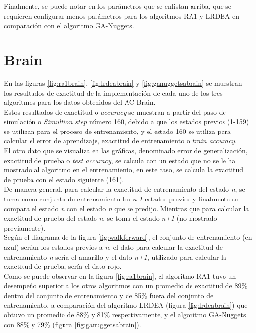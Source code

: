 Finalmente, se puede notar en los parámetros que se enlistan arriba, que se requieren configurar menos parámetros para los algoritmos RA1 y LRDEA en comparación con el algoritmo GA-Nuggets.


\section{Brain}
En las figuras \ref{fig:ra1brain}, \ref{fig:lrdeabrain} y \ref{fig:ganuggetsabrain} se muestran los resultados de exactitud de la implementación de cada uno de los tres algoritmos para los datos obtenidos del AC Brain.
\\

Estos resultados de exactitud o \emph{accuracy} se muestran a partir del paso de simulación o \emph{Simultion step} número 160, debido a que los estados previos (1-159) se utilizan para el proceso de entrenamiento, y el estado 160 se utiliza para calcular el error de aprendizaje, exactitud de entrenamiento o \emph{train accuracy}.
\\

El otro dato que se visualiza en las gráficas, denominado error de generalización, exactitud de prueba o \emph{test accuracy}, se calcula con un estado que no se le ha mostrado al algoritmo en el entrenamiento, en este caso, se calcula la exactitud de prueba con el estado siguiente (161).
\\

De manera general, para calcular la exactitud de entrenamiento del estado \textit{n}, se toma como conjunto de entrenamiento los \textit{n-1} estados previos y finalmente se compara el estado \textit{n} con el estado \textit{n} que se predijo. Mientras que para calcular la exactitud de prueba del estado \textit{n}, se toma el estado \textit{n+1} (no mostrado previamente).
\\

Según el diagrama de la figura \ref{fig:walkforward}, el conjunto de entrenamiento (en azul) serían los estados previos a \textit{n}, el dato para calcular la exactitud de entrenamiento \textit{n} sería el amarillo y el dato \textit{n+1}, utilizado para calcular la exactitud de prueba, sería el dato rojo.
\\

Como se puede observar en la figura \ref{fig:ra1brain}, el algoritmo RA1 tuvo un desempeño superior a los otros algoritmos con un promedio de exactitud de 89\% dentro del conjunto de entrenamiento y de 85\% fuera del conjunto de entrenamiento, a comparación del algoritmo LRDEA (figura \ref{fig:lrdeabrain}) que obtuvo un promedio de 88\% y 81\% respectivamente, y el algoritmo GA-Nuggets con 88\% y 79\% (figura \ref{fig:ganuggetsabrain}).


